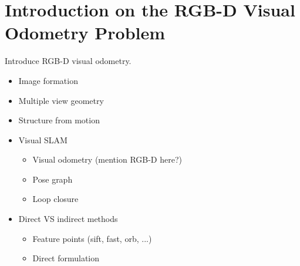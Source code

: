 \chapter{Introduction on the RGB-D Visual Odometry Problem}%
\label{cha:rgbd_vo}

Introduce RGB-D visual odometry.

\begin{itemize}
	\item Image formation
	\item Multiple view geometry
	\item Structure from motion
	\item Visual SLAM
	\begin{itemize}
		\item Visual odometry (mention RGB-D here?)
		\item Pose graph
		\item Loop closure
	\end{itemize}
	\item Direct VS indirect methods
	\begin{itemize}
		\item Feature points (sift, fast, orb, ...)
		\item Direct formulation
	\end{itemize}
\end{itemize}

